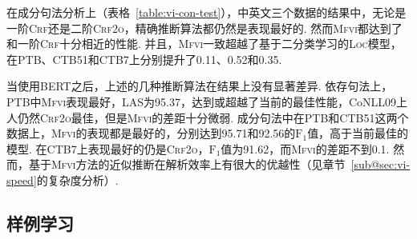 在成分句法分析上（表格~\ref{table:vi-con-test}），中英文三个数据的结果中，无论是一阶\textsc{Crf}还是二阶\textsc{Crf2o}，精确推断算法都仍然是表现最好的.
然而\textsc{Mfvi}都达到了和一阶\textsc{Crf}十分相近的性能.
并且，\textsc{Mfvi}一致超越了基于二分类学习的\textsc{Loc}模型，在PTB、CTB51和CTB7上分别提升了0.11、0.52和0.35.

当使用BERT之后，上述的几种推断算法在结果上没有显著差异.
依存句法上，PTB中\textsc{Mfvi}表现最好，LAS为95.37，达到或超越了当前的最佳性能\citep{zhou-zhao-2019-head,wang-tu-2020-second}，CoNLL09上人仍然\textsc{Crf2o}最佳，但是\textsc{Mfvi}的差距十分微弱.
成分句法中在PTB和CTB51这两个数据上，\textsc{Mfvi}的表现都是最好的，分别达到95.71和92.56的$\mathrm{F}_1$值，高于当前最佳的模型\cite{kitaev-etal-2019-multilingual}.
在CTB7上表现最好的仍是\textsc{Crf2o}，$\mathrm{F}_1$值为91.62，而\textsc{Mfvi}的差距不到0.1.
然而，基于\textsc{Mfvi}方法的近似推断在解析效率上有很大的优越性（见章节~\ref{sub@sec:vi-speed}的复杂度分析）.




\subsection{样例学习}

